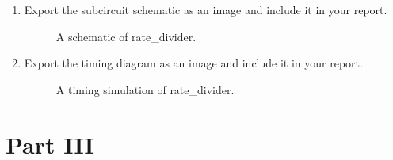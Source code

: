 \documentclass{article}
\begin{document}
\begin{enumerate}
\item Export the subcircuit schematic as an image and include it in your report.

\begin{figure}[ht!]
    \centering
    \caption{A schematic of rate\_divider.}
    \label{f:rate_divider}
\end{figure}

\item Export the timing diagram as an image and include it in your report.

\begin{figure}[ht!]
    \centering
    \caption{A timing simulation of rate\_divider.}
    \label{f:rate_divider_timing}
\end{figure}
\end{enumerate}

\section{Part III}
\end{document}
